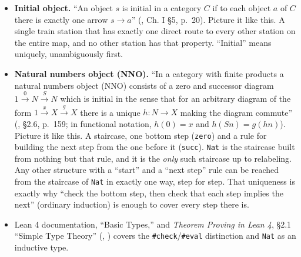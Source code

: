 \begin{itemize}
\item
  \textbf{Initial object.} ``An object \(s\) is initial in a category \(C\) if to each object \(a\) of \(C\) there is exactly one arrow \(s \to a\)'' (\cite{MacLane1998}, Ch. I §5, p.~20). Picture it like this. A single train station that has exactly one direct route to every other station on the entire map, and no other station has that property. ``Initial'' means uniquely, unambiguously first.
\item
  \textbf{Natural numbers object (NNO).} ``In a category with finite products a natural numbers object (NNO) consists of a zero and successor diagram \(1 \xrightarrow{0} N \xrightarrow{S} N\) which is initial in the sense that for an arbitrary diagram of the form \(1 \xrightarrow{x} X \xrightarrow{g} X\) there is a unique \(h : N \to X\) making the diagram commute'' (\cite{Jacobs1999}, §2.6, p.~159; in functional notation, \(h(0) = x\) and \(h(Sn) = g(hn)\)). Picture it like this. A staircase, one bottom step (\texttt{zero}) and a rule for building the next step from the one before it (\texttt{succ}). \texttt{Nat} is the staircase built from nothing but that rule, and it is the \emph{only} such staircase up to relabeling. Any other structure with a ``start'' and a ``next step'' rule can be reached from the staircase of \texttt{Nat} in exactly one way, step for step. That uniqueness is exactly why ``check the bottom step, then check that each step implies the next'' (ordinary induction) is enough to cover every step there is.
\item
  Lean 4 documentation, ``Basic Types,'' and \emph{Theorem Proving in Lean 4}, §2.1 ``Simple Type Theory'' (\cite{LeanDocs}, \cite{TPIL4}) covers the \texttt{\#check}/\texttt{\#eval} distinction and \texttt{Nat} as an inductive type.
\end{itemize}
